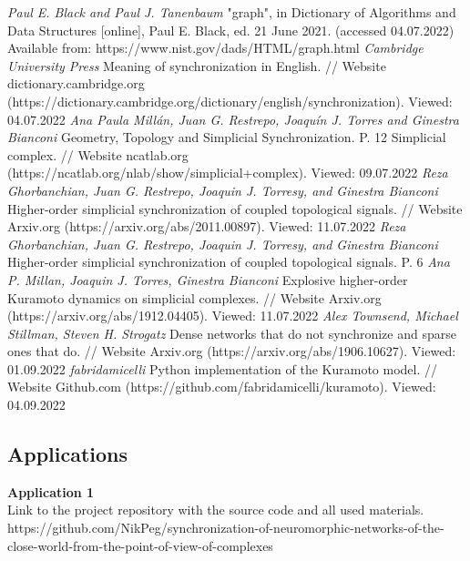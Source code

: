 \documentclass[draft]{article}
\newcommand\zz[1]{\par{\normalsize\strut #1} \hfill\ignorespaces}
\begin{document}
\newpage
\begin{center}
\begin{thebibliography}{}
 \textit{Paul E. Black and Paul J. Tanenbaum} "graph", in Dictionary of Algorithms and Data Structures [online], Paul E. Black, ed. 21 June 2021. (accessed 04.07.2022) Available from: https://www.nist.gov/dads/HTML/graph.html
 \textit{Cambridge University Press} Meaning of synchronization in English. // Website dictionary.cambridge.org (https://dictionary.cambridge.org/dictionary/english/synchronization). Viewed: 04.07.2022
 \textit{Ana Paula Millán, Juan G. Restrepo, Joaquín J. Torres and Ginestra Bianconi} Geometry, Topology and Simplicial Synchronization. P. 12
 Simplicial complex. // Website ncatlab.org (https://ncatlab.org/nlab/show/simplicial+complex). Viewed: 09.07.2022
 \textit{Reza Ghorbanchian, Juan G. Restrepo, Joaquin J. Torresy, and Ginestra Bianconi} Higher-order simplicial synchronization of coupled topological signals. // Website Arxiv.org (https://arxiv.org/abs/2011.00897). Viewed: 11.07.2022
 \textit{Reza Ghorbanchian, Juan G. Restrepo, Joaquin J. Torresy, and Ginestra Bianconi} Higher-order simplicial synchronization of coupled topological signals. P. 6
 \textit{Ana P. Millan, Joaquin J. Torres,  Ginestra Bianconi} Explosive higher-order Kuramoto dynamics on simplicial complexes. // Website Arxiv.org (https://arxiv.org/abs/1912.04405). Viewed: 11.07.2022
 \textit{Alex Townsend, Michael Stillman, Steven H. Strogatz} Dense networks that do not synchronize and sparse ones that do. // Website Arxiv.org (https://arxiv.org/abs/1906.10627). Viewed: 01.09.2022
 \textit{fabridamicelli} Python implementation of the Kuramoto model. // Website Github.com (https://github.com/fabridamicelli/kuramoto). Viewed: 04.09.2022
\end{thebibliography}
\end{center}
\newpage
\begin{center}
\section {Applications}
\end{center}
\zz{}\textbf{Application 1\\}
Link to the project repository with the source code and all used materials.\\
https://github.com/NikPeg/synchronization-of-neuromorphic-networks-of-the-close-world-from-the-point-of-view-of-complexes\\
\end{document}
